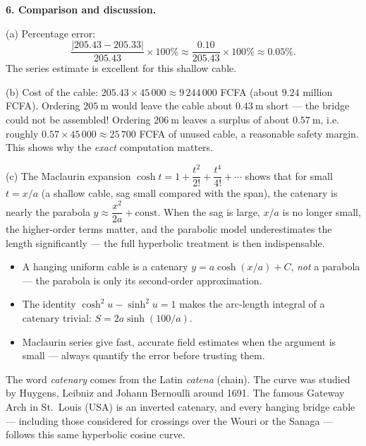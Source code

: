 \documentclass[11pt]{article}
\newcommand{\cle}[1]{{\popxbold\color{popdark}#1}}
\begin{document}
\textbf{6. Comparison and discussion.}

(a) Percentage error:
\[ \frac{|205.43 - 205.33|}{205.43}\times 100\% \approx \frac{0.10}{205.43}\times 100\% \approx 0.05\%. \]
The series estimate is excellent for this shallow cable.

(b) Cost of the cable: $205.43 \times 45\,000 \approx 9\,244\,000$ FCFA (about $9.24$ million FCFA). Ordering $205\ \mathrm{m}$ would leave the cable about $0.43\ \mathrm{m}$ short — the bridge could not be assembled! Ordering $206\ \mathrm{m}$ leaves a surplus of about $0.57\ \mathrm{m}$, i.e. roughly $0.57 \times 45\,000 \approx 25\,700$ FCFA of unused cable, a reasonable safety margin. This shows why the \emph{exact} computation matters.

(c) The Maclaurin expansion $\cosh t = 1 + \dfrac{t^2}{2!} + \dfrac{t^4}{4!} + \cdots$ shows that for small $t = x/a$ (a shallow cable, sag small compared with the span), the catenary is nearly the parabola $y \approx \dfrac{x^2}{2a} + \text{const}$. When the sag is large, $x/a$ is no longer small, the higher-order terms matter, and the parabolic model underestimates the length significantly — the full hyperbolic treatment is then indispensable.

\begin{aretenir}
\begin{itemize}
\item A hanging uniform cable is a \cle{catenary} $y = a\cosh(x/a) + C$, \emph{not} a parabola — the parabola is only its second-order approximation.
\item The identity $\cosh^2 u - \sinh^2 u = 1$ makes the arc-length integral of a catenary trivial: $S = 2a\sinh(100/a)$.
\item Maclaurin series give fast, accurate field estimates when the argument is small — always \cle{quantify the error} before trusting them.
\end{itemize}
\end{aretenir}

\begin{savaistu}
The word \emph{catenary} comes from the Latin \emph{catena} (chain). The curve was studied by Huygens, Leibniz and Johann Bernoulli around 1691. The famous Gateway Arch in St.\ Louis (USA) is an inverted catenary, and every hanging bridge cable — including those considered for crossings over the Wouri or the Sanaga — follows this same hyperbolic cosine curve.
\end{savaistu}
\end{document}
